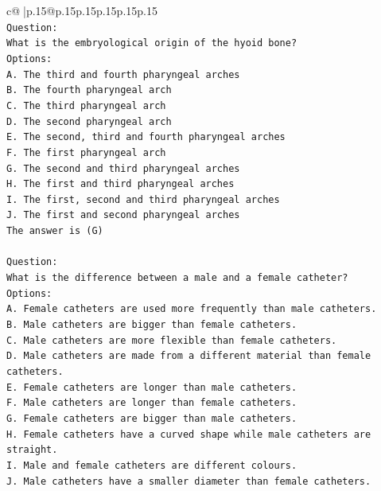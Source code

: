 \documentclass{article}
\begin{document}
{\begin{supertabular}{c@{$\;$}|p{.15\linewidth}@{}p{.15\linewidth}p{.15\linewidth}p{.15\linewidth}p{.15\linewidth}p{.15\linewidth}}
{{{\\ 
\texttt{Question:} \\
\texttt{What is the embryological origin of the hyoid bone?} \\
\texttt{Options:} \\
\texttt{A. The third and fourth pharyngeal arches} \\
\texttt{B. The fourth pharyngeal arch} \\
\texttt{C. The third pharyngeal arch} \\
\texttt{D. The second pharyngeal arch} \\
\texttt{E. The second, third and fourth pharyngeal arches} \\
\texttt{F. The first pharyngeal arch} \\
\texttt{G. The second and third pharyngeal arches} \\
\texttt{H. The first and third pharyngeal arches} \\
\texttt{I. The first, second and third pharyngeal arches} \\
\texttt{J. The first and second pharyngeal arches} \\
\texttt{The answer is (G)} \\
\\ 
\texttt{Question:} \\
\texttt{What is the difference between a male and a female catheter?} \\
\texttt{Options:} \\
\texttt{A. Female catheters are used more frequently than male catheters.} \\
\texttt{B. Male catheters are bigger than female catheters.} \\
\texttt{C. Male catheters are more flexible than female catheters.} \\
\texttt{D. Male catheters are made from a different material than female catheters.} \\
\texttt{E. Female catheters are longer than male catheters.} \\
\texttt{F. Male catheters are longer than female catheters.} \\
\texttt{G. Female catheters are bigger than male catheters.} \\
\texttt{H. Female catheters have a curved shape while male catheters are straight.} \\
\texttt{I. Male and female catheters are different colours.} \\
\texttt{J. Male catheters have a smaller diameter than female catheters.} \\
}}}
\end{supertabular}}
\end{document}
